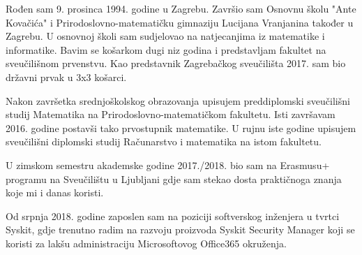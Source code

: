 \documentclass[a4paper,oneside,12pt]{memoir} %
\begin{document}
\begin{cv}
Rođen sam 9. prosinca 1994. godine u Zagrebu. Završio sam Osnovnu školu "Ante Kovačića" i Prirodoslovno-matematičku gimnaziju Lucijana Vranjanina također u Zagrebu. U osnovnoj školi sam sudjelovao na natjecanjima iz matematike i informatike. Bavim se košarkom dugi niz godina i predstavljam fakultet na sveučilišnom prvenstvu. Kao predstavnik Zagrebačkog sveučilišta 2017. sam bio državni prvak u 3x3 košarci.

Nakon završetka srednjoškolskog obrazovanja upisujem preddiplomski sveučilišni studij Matematika na Prirodoslovno-matematičkom fakultetu. Isti završavam 2016. godine postavši tako prvostupnik matematike. U rujnu iste godine upisujem sveučilišni diplomski studij Računarstvo i matematika na istom fakultetu.

U zimskom semestru akademske godine 2017./2018. bio sam na Erasmusu+ programu na Sveučilištu u Ljubljani gdje sam stekao dosta praktičnoga znanja koje mi i danas koristi.

Od srpnja 2018. godine zaposlen sam na poziciji softverskog inženjera u tvrtci Syskit, gdje trenutno radim na razvoju proizvoda Syskit Security Manager koji se koristi za lakšu administraciju Microsoftovog Office365 okruženja.
\end{cv}
\end{document}
